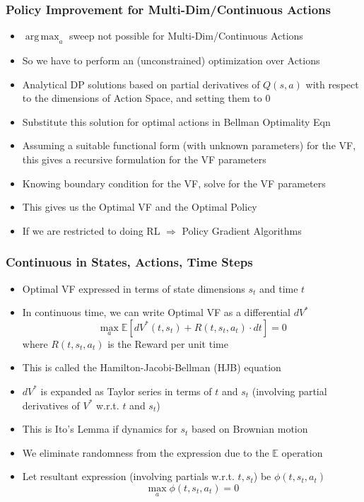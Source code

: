 \documentclass[handout]{beamer}
\DeclareMathOperator*{\argmax}{arg\,max}
\begin{document}
\begin{frame}
\frametitle{Policy Improvement for Multi-Dim/Continuous Actions}
\pause
\begin{itemize}[<+->]
\item $\argmax_a$ sweep not possible for Multi-Dim/Continuous Actions
\item So we have to perform an (unconstrained) optimization over Actions
\item Analytical DP solutions based on partial derivatives of $Q(s,a)$ with respect to the dimensions of Action Space, and setting them to 0
\item Substitute this solution for optimal actions in Bellman Optimality Eqn
\item Assuming a suitable functional form (with unknown parameters) for the VF, this gives a recursive formulation for the VF parameters
\item Knowing boundary condition for the VF, solve for the VF parameters
\item This gives us the Optimal VF and the Optimal Policy
\item If we are restricted to doing RL $\Rightarrow$ Policy Gradient Algorithms
\end{itemize}
\end{frame}

\begin{frame}
\frametitle{Continuous in States, Actions, Time Steps}
\pause
\begin{itemize}[<+->]
\item Optimal VF expressed in terms of state dimensions $s_t$ and time $t$
\item In continuous time, we can write Optimal VF as a differential $dV^*$
$$\max_a \mathbb{E}[dV^*(t,s_t) + R(t,s_t,a_t) \cdot dt] = 0$$
where $R(t,s_t,a_t)$ is the Reward per unit time
\item This is called the Hamilton-Jacobi-Bellman (HJB) equation
\item $dV^*$ is expanded as Taylor series in terms of $t$ and $s_t$ (involving partial derivatives of $V^*$ w.r.t. $t$ and $s_t$)
\item This is Ito's Lemma if dynamics for $s_t$ based on Brownian motion
\item We eliminate randomness from the expression due to the $\mathbb{E}$ operation
\item Let resultant expression (involving partials w.r.t. $t, s_t$) be $\phi(t,s_t,a_t)$
$$\max_a \phi(t,s_t, a_t) = 0$$
\end{itemize}
\end{frame}
\end{document}
